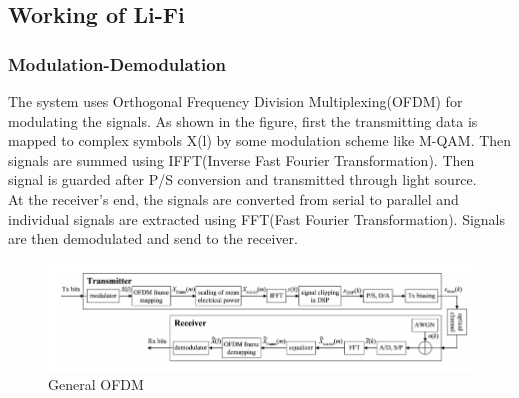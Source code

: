 \documentclass{article}
\begin{document}
\subsection{Working of Li-Fi}
\subsubsection{Modulation-Demodulation}
The system uses Orthogonal Frequency Division Multiplexing(OFDM) for modulating the signals. As shown in the figure, first the transmitting data is mapped to complex symbols X(l) by some modulation scheme like M-QAM. Then signals are summed using IFFT(Inverse Fast Fourier Transformation). Then signal is guarded after P/S conversion and transmitted through light source.\\
At the receiver's end, the signals are converted from serial to parallel and individual signals are extracted using FFT(Fast Fourier Transformation). Signals are then demodulated and send to the receiver. 
\begin{figure}[!h]
  \includegraphics[width=\linewidth]{res/OFDM_li_fi.PNG}
    \caption{General OFDM}
  \label{fig:OFDM_li_fi}
\end{figure}
\end{document}
